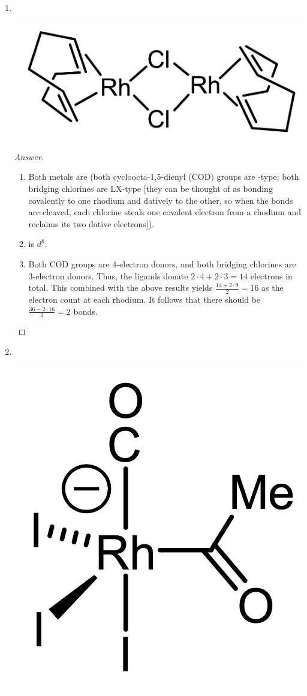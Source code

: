 \documentclass[../psets.tex]{subfiles}
\begin{document}
\begin{enumerate}
\begin{enumerate}[label={\arabic*)}]
\begin{proof}[Answer]
            \begin{enumerate}[label={(\roman*)}]
                \item {} (all ligands are X-type).
                \item {} is $d^0$.
                \item Both pentamethylcyclopentadienyl () groups are 5-electron donors, and both hydrogens are 1-electron donors. Thus, the ligands donate $2\cdot 5+2\cdot 1=12$ electrons in total. This combined with the above results yields $12+4=16$ as the electron count.
            \end{enumerate}
        \end{proof}
        \item ${\color{white}hi}$
        \begin{center}
            \includegraphics[width=0.3\linewidth]{../ExtFiles/pset1-1-06.png}
        \end{center}
        \begin{proof}[Answer]\leavevmode
            \begin{enumerate}[label={(\roman*)}]
                \item Both metals are  (both cycloocta-1,5-dienyl (COD) groups are -type; both bridging chlorines are LX-type [they can be thought of as bonding covalently to one rhodium and datively to the other, so when the bonds are cleaved, each chlorine steals one covalent electron from a rhodium and reclaims its two dative electrons]).
                \item {} is $d^8$.
                \item Both COD groups are 4-electron donors, and both bridging chlorines are 3-electron donors. Thus, the ligands donate $2\cdot 4+2\cdot 3=14$ electrons in total. This combined with the above results yields $\frac{14+2\cdot 9}{2}=16$ as the electron count at each rhodium. It follows that there should be $\frac{36-2\cdot 16}{2}=2$  bonds.
            \end{enumerate}
        \end{proof}
        \newpage
        \item ${\color{white}hi}$
        \begin{center}
            \includegraphics[width=0.16\linewidth]{../ExtFiles/pset1-1-07.png}

\end{center}
\end{enumerate}
\end{enumerate}
\end{document}
